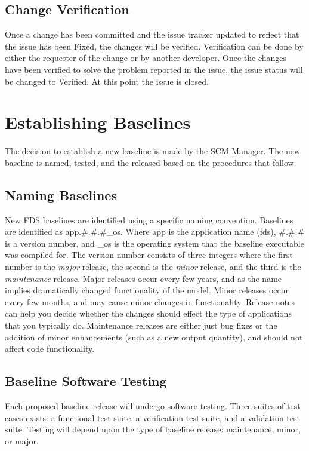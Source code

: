\documentclass[11pt]{book}
\begin{document}
\subsection{Change Verification}

Once a change has been committed and the issue tracker updated to reflect that the issue has been {\ct Fixed},
the changes will be verified.  Verification can be done by either the requester of the change or by another 
developer.  Once the changes have been verified to solve the problem reported in the issue, the issue status will
be changed to {\ct Verified}.  At this point the issue is closed.


\section{Establishing Baselines}

The decision to establish a new baseline is made by the SCM Manager.  The new baseline is named, tested, and the
released based on the procedures that follow.

\subsection{Naming Baselines}

New FDS baselines are identified using a specific naming convention. Baselines are identified as app.\#.\#.\#\_os. 
Where app is the application name (fds), \#.\#.\# is a version number, and \_os is the operating system that the
baseline executable was compiled for.  The version number consists of three integers where the first number
is the {\em major} release, the second is the {\em minor} release, and the third is the {\em maintenance}
release.  Major releases occur every few years, and as the name implies dramatically changed functionality of the
model. Minor releases occur every few months, and may cause minor changes in functionality. 
Release notes can help you decide whether the changes should effect the type of applications that you typically do.
Maintenance releases are either just bug fixes or the addition of minor enhancements (such as a new output quantity),
and should not affect code functionality.

\subsection{Baseline Software Testing}

Each proposed baseline release will undergo software testing.  Three suites of test cases exists: a functional test suite,
a verification test suite, and a validation test suite.  Testing will depend upon the type of baseline release: 
maintenance, minor, or major.
\end{document}
